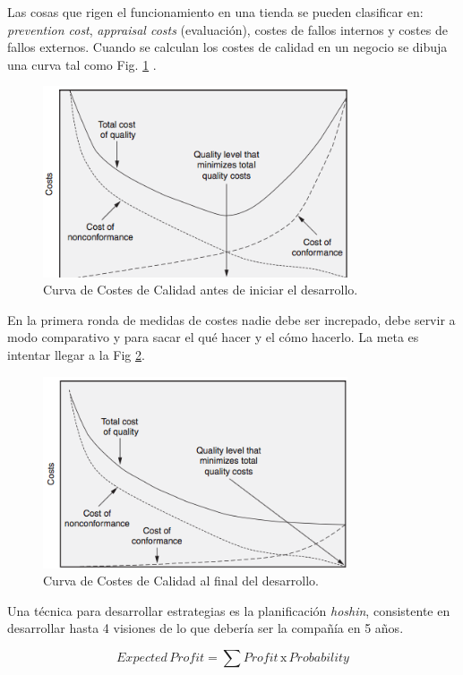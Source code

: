 \documentclass[oneside]{book}
\begin{document}
Las cosas que rigen el funcionamiento en una tienda se pueden clasificar en: \textit{prevention cost}, \textit{appraisal costs} (evaluación), costes de fallos internos y costes de fallos externos. 
Cuando se calculan los costes de calidad en un negocio se dibuja una curva tal como Fig. \ref{fig:CurvaCostesdeCalidadInicio} .
\begin{figure}[ht!]
\centering
\includegraphics[width=90mm]{imagenes/CurvaCostesCalidadInicio.png}
\caption{Curva de Costes de Calidad antes de iniciar el desarrollo.}
\label{fig:CurvaCostesdeCalidadInicio}
\end{figure}

En la primera ronda de medidas de costes nadie debe ser increpado, debe servir a modo comparativo y para sacar el qué hacer y el cómo hacerlo. La meta es intentar llegar a la Fig \ref{fig:CurvaCostesdeCalidadFin}.

\begin{figure}[ht!]
	\centering
	\includegraphics[width=90mm]{imagenes/CurvaCostesCalidadFin.png}
	\caption{Curva de Costes de Calidad al final del desarrollo.}
	\label{fig:CurvaCostesdeCalidadFin}
\end{figure}

Una técnica para desarrollar estrategias es la planificación \textit{hoshin}, consistente en desarrollar hasta 4 visiones de lo que debería ser la compañía en 5 años.

\begin{equation}
Expected \, Profit  = \sum Profit \, \mathrm{x} \, Probability
\end{equation}
\end{document}
